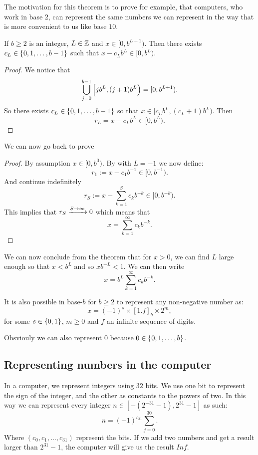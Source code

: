 \documentclass[11pt,a4paper]{article}
\begin{document}
The motivation for this theorem is to prove for example, that computers,
who work in base $2$, can represent the same numbers we can represent
in the way that is more convenient to us like base $10$.

\begin{lemma}
  \label{lem:bases}
  If $b \geq 2$ is an integer, $L \in \mathbb{Z}$ and $x \in [0,b^{L+1})$.
  Then there exists $c_L \in \left\{0,1,\dots,b-1\right\}$ such that
  $x - c_L b^{L} \in [0,b^L)$.
\end{lemma}
\begin{proof}
  We notice that
  \[
    \bigcup_{j=0}^{b-1} \intco{j b^L, (j + 1) b^L} =
    [0, b^{L+1}).
  \]
  So there exists $c_L \in \left\{0,1,\dots,b-1\right\}$ so that 
  $x \in [c_L b^L, (c_L + 1) b^L)$.
  Then
  \[
    r_L = x - c_L b^L \in [0,b^L).
  \]
\end{proof}

We can now go back to prove 

\begin{proof}
  By assumption $x \in [0,b^0)$.
  By  with $L = -1$ we now define:
  \[
    r_1 := x - c_1 b^{-1} \in [0,b^{-1}).
  \]
  And continue indefinitely
  \[
    r_S := x - \sum_{k=1}^{S} c_k b^{-k} \in [0,b^{-k}).
  \]
  This implies that $r_S \xrightarrow{S \to \infty} 0$ which means that
  \[
    x = \sum_{k=1}^{\infty} c_k b^{-k}.
  \]
\end{proof}

We can now conclude from the theorem that for $x > 0$, we can find $L$
large enough so that $x < b^L$ and so $x b^{-L} < 1$.
We can then write
\[
  x = b^L \sum_{k=1}^{\infty} c_k b^{-k}.
\]

It is also possible in base-$b$ for $b \geq 2$ to represent any
non-negative number as:
\[
  x = (-1)^s \times [1.f]_b \times 2^m,
\]
for some $s \in \left\{0,1\right\}$, $m \geq 0$ and $f$ an infinite sequence
of digits.

\begin{remark}
  Obsviouly we can also represent $0$ because $0 \in \left\{0,1,\dots,b\right\}$.
\end{remark}

\subsection{Representing numbers in the computer}

\begin{definition}[Integers]
  In a computer, we represent integers using $32$ bits.
  We use one bit to represent the sign of the integer,
  and the other as constants to the powers of two.
  In this way we can represent every integer 
  $n \in [- (2^{-31} - 1), 2^{31} - 1]$ as such:
  \[
    n = (-1)^{c_31} \sum_{j=0}^{30}.
  \]
  Where $(c_0,c_1,\dots,c_{31})$ represent the bits.
  If we add two numbers and get a result larger than $2^31 - 1$,
  the computer will give us the result $Inf$.
\end{definition}
\end{document}

